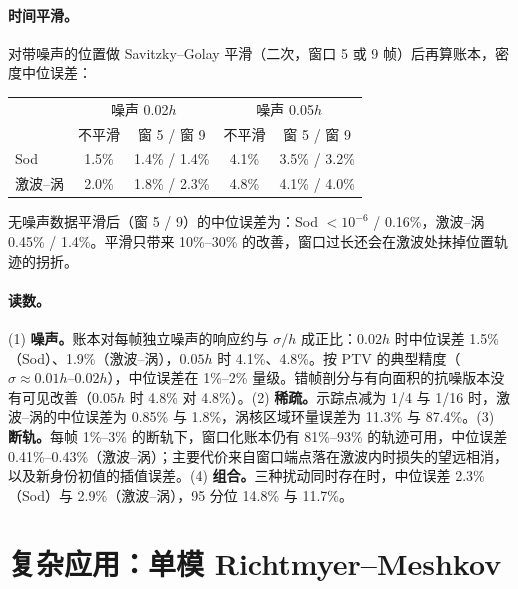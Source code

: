 \paragraph{时间平滑。}对带噪声的位置做 Savitzky–Golay 平滑（二次，窗口 5 或 9 帧）后再算账本，密度中位误差：
\begin{center}\small\begin{tabular}{lcccc}\toprule & \multicolumn{2}{c}{噪声 0.02$h$} & \multicolumn{2}{c}{噪声 0.05$h$}\\ & 不平滑 & 窗 5 / 窗 9 & 不平滑 & 窗 5 / 窗 9\\\midrule
Sod & 1.5\% & 1.4\% / 1.4\% & 4.1\% & 3.5\% / 3.2\%\\
激波–涡 & 2.0\% & 1.8\% / 2.3\% & 4.8\% & 4.1\% / 4.0\%\\
\bottomrule\end{tabular}\end{center}
无噪声数据平滑后（窗 5 / 9）的中位误差为：Sod $<10^{-6}$ / 0.16\%，激波–涡 0.45\% / 1.4\%。平滑只带来 10\%–30\% 的改善，窗口过长还会在激波处抹掉位置轨迹的拐折。
\paragraph{读数。}(1) \textbf{噪声。}账本对每帧独立噪声的响应约与 $\sigma/h$ 成正比：$0.02h$ 时中位误差 1.5\%（Sod）、1.9\%（激波–涡），$0.05h$ 时 4.1\%、4.8\%。按 PTV 的典型精度（$\sigma\approx0.01h$–$0.02h$），中位误差在 1\%–2\% 量级。错帧剖分与有向面积的抗噪版本没有可见改善（$0.05h$ 时 4.8\% 对 4.8\%）。(2) \textbf{稀疏。}示踪点减为 1/4 与 1/16 时，激波–涡的中位误差为 0.85\% 与 1.8\%，涡核区域环量误差为 11.3\% 与 87.4\%。(3) \textbf{断轨。}每帧 1\%–3\% 的断轨下，窗口化账本仍有 81\%–93\% 的轨迹可用，中位误差 0.41\%–0.43\%（激波–涡）；主要代价来自窗口端点落在激波内时损失的望远相消，以及新身份初值的插值误差。(4) \textbf{组合。}三种扰动同时存在时，中位误差 2.3\%（Sod）与 2.9\%（激波–涡），95 分位 14.8\% 与 11.7\%。

\section{复杂应用：单模 Richtmyer–Meshkov}\label{pB:sec:rm}
